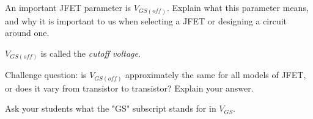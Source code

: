 

An important JFET parameter is $V_{GS(off)}$.  Explain what this parameter means, and why it is important to us when selecting a JFET or designing a circuit around one.







$V_{GS(off)}$ is called the {\it cutoff voltage}.

\vskip 10pt

Challenge question: is $V_{GS(off)}$ approximately the same for all models of JFET, or does it vary from transistor to transistor?  Explain your answer.







Ask your students what the "GS" subscript stands for in $V_{GS}$.




